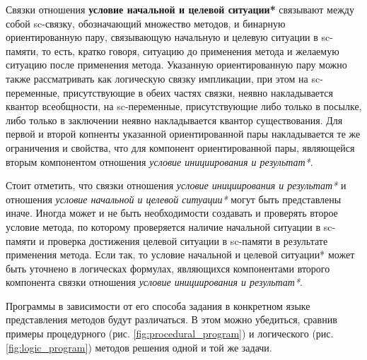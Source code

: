 Связки отношения \textbf{условие начальной и целевой ситуации*} связывают между собой sc-связку, обозначающий множество методов, и бинарную ориентированную пару, связывающую начальную и целевую ситуации в sc-памяти, то есть, кратко говоря, ситуацию до применения метода и желаемую ситуацию после применения метода. Указанную ориентированную пару можно также рассматривать как логическую связку импликации, при этом на sc-переменные, присутствующие в обеих частях связки, неявно накладывается квантор всеобщности, на sc-переменные, присутствующие либо только в посылке, либо только в заключении неявно накладывается квантор существования. Для первой и второй копненты указанной ориентированной пары накладывается те же ограничения и свойства, что для компонент ориентированной пары, являющейся вторым компонентом отношения \textit{условие инициирования и результат*}.

Стоит отметить, что связки отношения \textit{условие инициирования и результат*} и отношения \textit{условие начальной и целевой ситуации*} могут быть представлены иначе. Иногда может и не быть необходимости создавать и проверять второе условие метода, по которому проверяется наличие начальной ситуации в sc-памяти и проверка достижения целевой ситуации в sc-памяти в результате применения метода. Если так, то условие начальной и целевой ситуации* может быть уточнено в логическах формулах, являющихся компонентами второго компонента связки отношения \textit{условие инициирования и результат*}.

Программы в зависимости от его способа задания в конкретном языке представления методов будут различаться. В этом можно убедиться, сравнив примеры процедурного (рис. \ref{fig:procedural_program}) и логического (рис. \ref{fig:logic_program}) методов решения одной и той же задачи.

